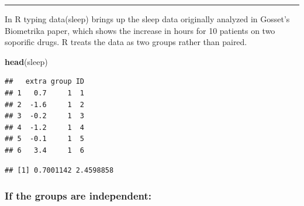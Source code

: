 \documentclass[]{article}
\newenvironment{Shaded}{\begin{snugshade}}{\end{snugshade}}
\newcommand{\DecValTok}[1]{\textcolor[rgb]{0.00,0.00,0.81}{#1}}
\newcommand{\KeywordTok}[1]{\textcolor[rgb]{0.13,0.29,0.53}{\textbf{#1}}}
\newcommand{\NormalTok}[1]{#1}
\newcommand{\OperatorTok}[1]{\textcolor[rgb]{0.81,0.36,0.00}{\textbf{#1}}}
\newcommand{\StringTok}[1]{\textcolor[rgb]{0.31,0.60,0.02}{#1}}
\begin{document}
\begin{center}\rule{0.5\linewidth}{\linethickness}\end{center}

In R typing data(sleep) brings up the sleep data originally analyzed in
Gosset's Biometrika paper, which shows the increase in hours for 10
patients on two soporific drugs. R treats the data as two groups rather
than paired.

\begin{Shaded}
\begin{Highlighting}[]
\KeywordTok{head}\NormalTok{(sleep)}
\end{Highlighting}
\end{Shaded}

\begin{verbatim}
##   extra group ID
## 1   0.7     1  1
## 2  -1.6     1  2
## 3  -0.2     1  3
## 4  -1.2     1  4
## 5  -0.1     1  5
## 6   3.4     1  6
\end{verbatim}

\begin{Shaded}
\end{Shaded}

\begin{verbatim}
## [1] 0.7001142 2.4598858
\end{verbatim}

\hypertarget{if-the-groups-are-independent}{%
\subsubsection{If the groups are
independent:}\label{if-the-groups-are-independent}}
\end{document}
